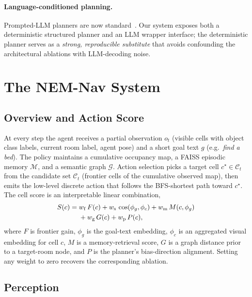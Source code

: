 \documentclass[conference,a4paper,10pt]{IEEEtran}
\begin{document}
\paragraph{Language-conditioned planning.}
Prompted-LLM planners are now standard~\cite{zhou2023esc,
dorbala2023llmnav, huang2022innermono}. Our system exposes both a
deterministic structured planner and an LLM wrapper interface; the
deterministic planner serves as a \emph{strong, reproducible substitute}
that avoids confounding the architectural ablations with LLM-decoding
noise.

\section{The NEM-Nav System}

\subsection{Overview and Action Score}

At every step the agent receives a partial observation $o_t$ (visible
cells with object class labels, current room label, agent pose) and a
short goal text $g$ (e.g.\ \emph{find a bed}). The policy maintains a
cumulative occupancy map, a FAISS episodic memory $\mathcal{M}$, and a
semantic graph $\mathcal{G}$. Action selection picks a target cell
$c^\star \in \mathcal{C}_t$ from the candidate set
$\mathcal{C}_t$ (frontier cells of the cumulative observed map), then
emits the low-level discrete action that follows the BFS-shortest path
toward $c^\star$. The cell score is an interpretable linear combination,
\begin{align}
\textstyle
S(c) =\; & w_{\mathrm{f}}\, F(c) + w_{\mathrm{s}}\, \cos(\phi_g, \phi_c) +
        w_{\mathrm{m}}\, M(c, \phi_g) \notag\\
        & + w_{\mathrm{g}}\, G(c) + w_{\mathrm{p}}\, P(c),
\label{eq:score}
\end{align}
where $F$ is frontier gain, $\phi_g$ is the goal-text embedding,
$\phi_c$ is an aggregated visual embedding for cell $c$, $M$ is a
memory-retrieval score, $G$ is a graph distance prior to a target-room
node, and $P$ is the planner's bias-direction alignment. Setting any
weight to zero recovers the corresponding ablation.

\subsection{Perception}
\end{document}
